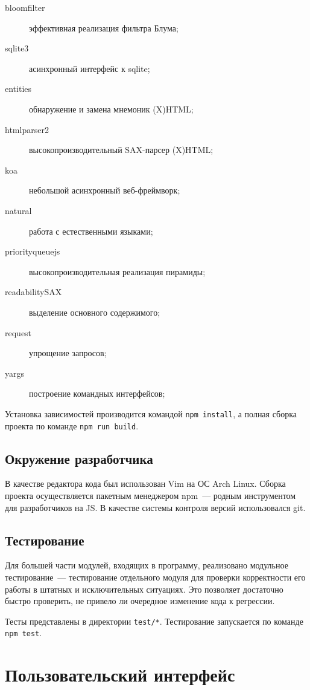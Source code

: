 \begin{description}
  \item[bloomfilter] эффективная реализация фильтра Блума;
  \item[sqlite3] асинхронный интерфейс к sqlite;
  \item[entities] обнаружение и замена мнемоник (X)HTML;
  \item[htmlparser2] высокопроизводительный SAX-парсер (X)HTML;
  \item[koa] небольшой асинхронный веб-фреймворк;
  \item[natural] работа с естественными языками;
  \item[priorityqueuejs] высокопроизводительная реализация пирамиды;
  \item[readabilitySAX] выделение основного содержимого;
  \item[request] упрощение запросов;
  \item[yargs] построение командных интерфейсов;
\end{description}

Установка зависимостей производится командой \verb|npm install|, а полная сборка проекта по команде \verb|npm run build|.


\subsection*{Окружение разработчика}
В качестве редактора кода был использован Vim на ОС Arch Linux. Сборка проекта осуществляется пакетным менеджером npm~--- родным инструментом для разработчиков на JS. В качестве системы контроля версий использовался git.


\subsection*{Тестирование}
Для большей части модулей, входящих в программу, реализовано модульное тестирование~--- тестирование отдельного модуля для проверки корректности его работы в штатных и исключительных ситуациях. Это позволяет достаточно быстро проверить, не привело ли очередное изменение кода к регрессии.

Тесты представлены в директории \verb|test/*|. Тестирование запускается по команде \verb|npm test|.


\section{Пользовательский интерфейс}
